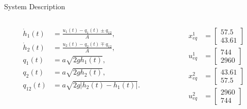 \begin{slide}{System Description}
  \vspace*{\fill}
  \begin{columns}[T]
    \begin{column}{0.48\textwidth}
      \begin{equation}
        \label{eq:formula-height-variation-lin}
        \begin{aligned}
          \dot{h}_1(t) & = \frac{u_1(t)-q_1(t)\pm{}q_{12}}{A},   \\
          \dot{h}_2(t) & = \frac{u_2(t)-q_2(t)\mp{}q_{12}}{A},   \\
          q_1(t)       & = a\sqrt{2gh_1(t)},                     \\
          q_2(t)       & = a\sqrt{2gh_2(t)},                     \\
          q_{12}(t)    & = a\sqrt{2g\left|h_2(t)-h_1(t)\right|}.
        \end{aligned}
      \end{equation}
    \end{column}%
    \hfill%
    \begin{column}{0.48\textwidth}
      \begin{equation}
        \begin{aligned}
          x_{eq}^1 & = \begin{bmatrix}
            57.5 \\ 43.61
          \end{bmatrix} \\
          u_{eq}^1 & = \begin{bmatrix}
            744 \\ 2960
          \end{bmatrix} \\
          x_{eq}^2 & = \begin{bmatrix}
            43.61 \\ 57.5
          \end{bmatrix} \\
          u_{eq}^2 & = \begin{bmatrix}
            2960 \\ 744
          \end{bmatrix}
        \end{aligned}
      \end{equation}
    \end{column}%
  \end{columns}
  \vspace*{\fill}
\end{slide}

